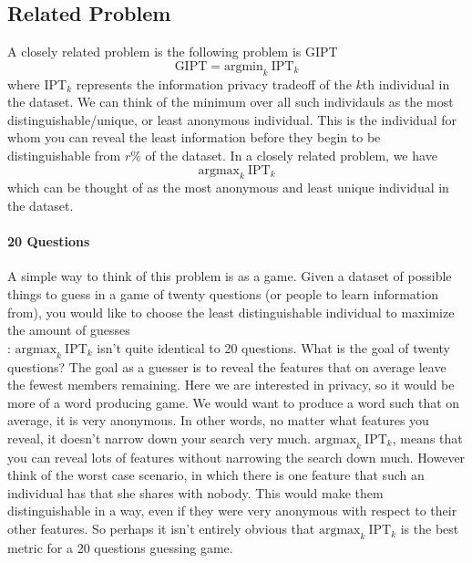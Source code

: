 \documentclass[12pt]{article}
\newcommand{\priv}{\text{IPT}}
\begin{document}
\subsection{Related Problem}
A closely related problem is the following problem is \gls{GIPT}
\[\text{GIPT} = \text{argmin}_k \ \priv_k\]
where $\priv_k$ represents the information privacy tradeoff of the $k$th individual in the dataset. We can think of the minimum over all such individauls as the most distinguishable/unique, or least anonymous individual. This is the individual for whom you can reveal the least information before they begin to be distinguishable from $r$\% of the dataset. 
In a closely related problem, we have 
\[\text{argmax}_k \ \priv_k\]
which can be thought of as the most anonymous and least unique individual in the dataset. 
\paragraph{20 Questions}
A simple way to think of this problem is as a game. Given a dataset of possible things to guess in a game of twenty questions (or people to learn information from), you would like to choose the least distinguishable individual to maximize the amount of guesses  \\
: $\text{argmax}_k \ \priv_k$ isn't quite identical to 20 questions. What is the goal of twenty questions? The goal as a guesser is to reveal the features that on average leave the fewest members remaining. Here we are interested in privacy, so it would be more of a word producing game. We would want to produce a word such that on average, it is very anonymous. In other words, no matter what features you reveal, it doesn't narrow down your search very much. $\text{argmax}_k \ \priv_k$, means that you can reveal lots of features without narrowing the search down much. However think of the worst case scenario, in which there is one feature that such an individual has that she shares with nobody. This would make them distinguishable in a way, even if they were very anonymous with respect to their other features. So perhaps it isn't entirely obvious that $\text{argmax}_k \ \priv_k$ is the best metric for a 20 questions guessing game.
\end{document}
